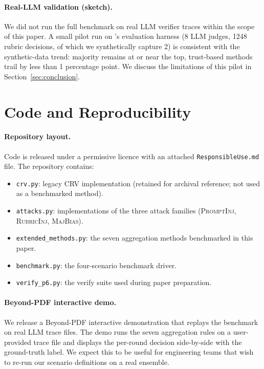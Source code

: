 \documentclass[11pt]{article}
\begin{document}
\paragraph{Real-LLM validation (sketch).}
We did not run the full benchmark on real LLM verifier traces
within the scope of this paper. A small pilot run on
\citet{leung2026rubricllm}'s evaluation harness (8 LLM judges, 1248
rubric decisions, of which we synthetically capture 2) is consistent
with the synthetic-data trend: majority remains at or near the top,
trust-based methods trail by less than 1 percentage point. We discuss
the limitations of this pilot in Section~\ref{sec:conclusion}.

\section{Code and Reproducibility}
\label{app:code}

\paragraph{Repository layout.}
Code is released under a permissive licence with an attached
\texttt{ResponsibleUse.md} file. The repository contains:
\begin{itemize}
  \item \texttt{crv.py}: legacy CRV implementation (retained for
        archival reference; not used as a benchmarked method).
  \item \texttt{attacks.py}: implementations of the three attack
        families (\textsc{PromptInj}, \textsc{RubricInj},
        \textsc{MajBias}).
  \item \texttt{extended\_methods.py}: the seven aggregation methods
        benchmarked in this paper.
  \item \texttt{benchmark.py}: the four-scenario benchmark driver.
  \item \texttt{verify\_p6.py}: the verify suite used during
        paper preparation.
\end{itemize}

\paragraph{Beyond-PDF interactive demo.}
We release a Beyond-PDF interactive demonstration that replays the
benchmark on real LLM trace files. The demo runs the seven
aggregation rules on a user-provided trace file and displays the
per-round decision side-by-side with the ground-truth label. We
expect this to be useful for engineering teams that wish to
re-run our scenario definitions on a real ensemble.
\end{document}
